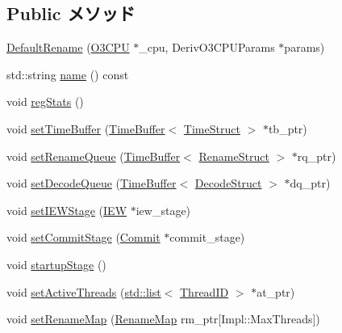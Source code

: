\subsection*{Public メソッド}
\begin{DoxyCompactItemize}
\item 
\hyperlink{classDefaultRename_a6035d792bb85b9f4c301d53c20885dfc}{DefaultRename} (\hyperlink{classDefaultRename_a44622cf06940413482836cb62931ac3f}{O3CPU} $\ast$\_\-cpu, DerivO3CPUParams $\ast$params)
\item 
std::string \hyperlink{classDefaultRename_a37627d5d5bba7f4a8690c71c2ab3cb07}{name} () const 
\item 
void \hyperlink{classDefaultRename_a4dc637449366fcdfc4e764cdf12d9b11}{regStats} ()
\item 
void \hyperlink{classDefaultRename_a2b521ea5f191fff72265f60d4ed5187b}{setTimeBuffer} (\hyperlink{classTimeBuffer}{TimeBuffer}$<$ \hyperlink{structTimeStruct}{TimeStruct} $>$ $\ast$tb\_\-ptr)
\item 
void \hyperlink{classDefaultRename_a701624f92a819fe4205faede6e614d9f}{setRenameQueue} (\hyperlink{classTimeBuffer}{TimeBuffer}$<$ \hyperlink{classDefaultRename_a0c2a89ad2edad9ad605d0461f9b132a5}{RenameStruct} $>$ $\ast$rq\_\-ptr)
\item 
void \hyperlink{classDefaultRename_a21f95db13a2fc05d7a5fcc43fec1f1e7}{setDecodeQueue} (\hyperlink{classTimeBuffer}{TimeBuffer}$<$ \hyperlink{classDefaultRename_a38077cd156cf219016abf92d8c5b523b}{DecodeStruct} $>$ $\ast$dq\_\-ptr)
\item 
void \hyperlink{classDefaultRename_a4b6d8e4b2cf6249763ed2fc73eb1af47}{setIEWStage} (\hyperlink{classDefaultRename_a2e298f790f528754f0e0ffa0cb8088f6}{IEW} $\ast$iew\_\-stage)
\item 
void \hyperlink{classDefaultRename_a1e488bc36055daaf1f86a9b4e58118c2}{setCommitStage} (\hyperlink{classDefaultRename_a05a26def5ee77f19d25b86079d161ebd}{Commit} $\ast$commit\_\-stage)
\item 
void \hyperlink{classDefaultRename_a31d4cbdab16d4ff8d6bc7f84ece727da}{startupStage} ()
\item 
void \hyperlink{classDefaultRename_aab96bdacf8bd420402cbb543f994e054}{setActiveThreads} (\hyperlink{classstd_1_1list}{std::list}$<$ \hyperlink{base_2types_8hh_ab39b1a4f9dad884694c7a74ed69e6a6b}{ThreadID} $>$ $\ast$at\_\-ptr)
\item 
void \hyperlink{classDefaultRename_a6f0aaedb2c39d674ef86c25d0aeb4211}{setRenameMap} (\hyperlink{classDefaultRename_a341963bcea1928476182a17e357f98e3}{RenameMap} rm\_\-ptr\mbox{[}Impl::MaxThreads\mbox{]})

\end{DoxyCompactItemize}
